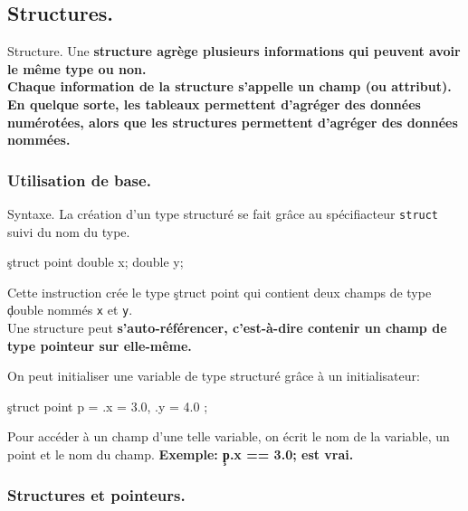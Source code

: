 \documentclass[french, 11pt]{article}
\begin{document}
\subsection{Structures.}

\begin{defi}{Structure.}{}
    Une \bf{structure} agrège plusieurs informations qui peuvent avoir le même type ou non.\\
    Chaque information de la structure s'appelle un \bf{champ} (ou attribut).\\
    En quelque sorte, les tableaux permettent d'agréger des données numérotées, alors que les structures permettent d'agréger des données nommées.
\end{defi}

\subsubsection{Utilisation de base.}

\begin{defi}{Syntaxe.}{}
    La création d'un type structuré se fait grâce au spécifiacteur \texttt{struct} suivi du nom du type.
    \begin{center}
        \c{struct point { double x; double y; }}
    \end{center}
    Cette instruction crée le type \c{struct point} qui contient deux champs de type \c{double} nommés \texttt{x} et \texttt{y}.\\
    Une structure peut \bf{s'auto-référencer}, c'est-à-dire contenir un champ de type pointeur sur elle-même.
\end{defi}

\begin{defi}{}{}
    On peut initialiser une variable de type structuré grâce à un initialisateur:
    \begin{center}
        \c{struct point p = { .x = 3.0, .y = 4.0 };}
    \end{center}
    Pour accéder à un champ d'une telle variable, on écrit le nom de la variable, un point et le nom du champ.\n
    \bf{Exemple:} \c{p.x == 3.0;} est vrai.
\end{defi}

\subsubsection{Structures et pointeurs.}
\end{document}
